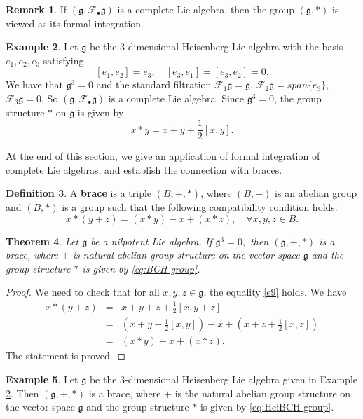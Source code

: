 \documentclass[12pt]{amsart}
\newtheorem{thm}{Theorem}[section]
\theoremstyle{definition}   %
\newtheorem{defi}[thm]{Definition}
\newtheorem{ex}[thm]{Example}
\newtheorem{rmk}[thm]{Remark}
\newcommand{\g}{\mathfrak g}
\newcommand{\huaF}{\mathcal{F}}
\begin{document}
\begin{rmk}
  If $(\g,\huaF_{\bullet}\g)$ is a complete   Lie algebra,
then
  the group $(\g,*)$   is viewed as its formal integration.
\end{rmk}

\begin{ex}\label{ex:Hei-group}
Let $\mathfrak g$ be the 3-dimensional Heisenberg Lie algebra with the basis $e_1,e_2,e_3$ satisfying
$$
[e_1,e_2]=e_3,\quad [e_3,e_1]=[e_3,e_2]=0.
$$
We have that $\g^3=0$ and the standard filtration $\huaF_1\g=\g$, $\huaF_2\g=span\{e_3\}$, $\huaF_3\g=0$.
So $(\g,\huaF_{\bullet}\g)$ is a complete  Lie algebra. Since $\g^3=0$, the group structure $*$ on $\g$ is given by
\begin{equation}\label{eq:HeiBCH-group}
x*y=x+y+\frac{1}{2}[x,y].
\end{equation}
\end{ex}

At the end of this section, we give an application of formal integration of complete Lie algebras, and establish the connection with braces.

\begin{defi}{\rm\cite{Rump1}}
  A {\bf brace} is a triple $(B, +, *)$, where
  $(B, +)$ is an abelian group and $(B, *)$ is a group such that the following compatibility condition holds:
 \begin{equation}\label{e9}
 x*(y+z)=(x*y)-x+(x*z),\quad \forall x,y,z\in B.
 \end{equation}
\end{defi}


\begin{thm}
Let $\mathfrak g$ be a nilpotent Lie algebra. If $\g^3=0,$ then $(\mathfrak g, +, *)$ is a brace, where $+$ is natural abelian group structure on the vector space $\g$ and  the group structure $*$ is given by \eqref{eq:BCH-group}.
\end{thm}

\begin{proof}
We need to check that for all $x,y,z\in \mathfrak g$, the equality \eqref{e9} holds. We have
\begin{eqnarray*}
  x*(y+z)&=&x+y+z+\frac{1}{2}[x,y+z]\\
  &=&(x+y+\frac{1}{2}[x,y])-x+(x+z+\frac{1}{2}[x,z])\\
  &=&(x*y)-x+(x*z).
\end{eqnarray*}
   The statement is proved.
\end{proof}

\begin{ex}
  Let $\mathfrak g$ be the 3-dimensional Heisenberg Lie algebra given in Example \ref{ex:Hei-group}. Then $(\g,+,*)$ is a brace, where $+$ is the natural abelian group structure on the vector space $\g$ and  the group structure $*$ is given by \eqref{eq:HeiBCH-group}.
\end{ex}
\end{document}
